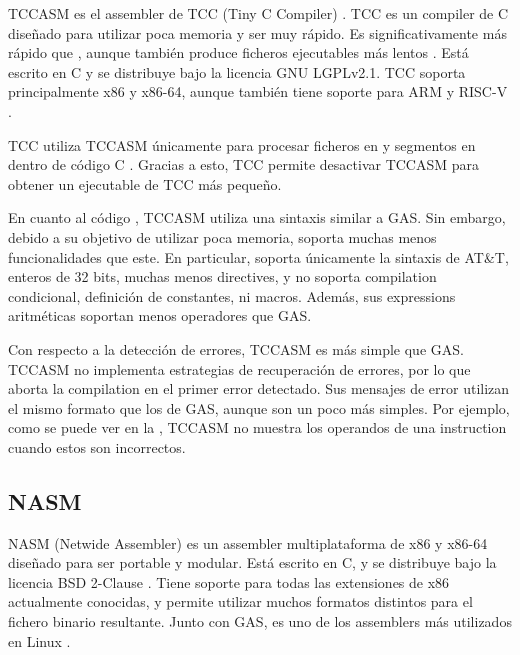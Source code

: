 TCCASM es el \gls{assembler} de TCC (Tiny C Compiler) \parencite{tcc}. TCC es un
\gls{compiler} de C diseñado para utilizar poca memoria y ser muy rápido. Es
significativamente más rápido  que
, aunque también produce ficheros ejecutables más lentos
\parencite{tcc-speed}. Está escrito en C y se distribuye bajo la licencia GNU
LGPLv2.1. TCC soporta principalmente x86 y x86-64, aunque también tiene soporte para
ARM y RISC-V \parencite{tcc-manual} \parencite{tcc-arm} \parencite{tcc-riscv}.

TCC utiliza TCCASM únicamente para procesar ficheros en
 y segmentos en 
dentro de código C \parencite{tcc-manual}. Gracias a esto, TCC permite
desactivar TCCASM para obtener un ejecutable de TCC más pequeño.

En cuanto al código , TCCASM utiliza una sintaxis
similar a \gls{GAS}. Sin embargo, debido a su objetivo de utilizar poca memoria,
soporta muchas menos funcionalidades que este. En particular, soporta únicamente
la sintaxis de AT\&T, enteros de 32 bits, muchas menos \glspl{directive}, y no
soporta \gls{compilation} condicional, definición de constantes, ni
\glspl{macro}. Además, sus \glspl{expression} aritméticas soportan menos
operadores que \gls{GAS}.

Con respecto a la detección de errores, TCCASM es más simple que \gls{GAS}.
TCCASM no implementa estrategias de recuperación de errores, por lo que aborta
la \gls{compilation} en el primer error detectado. Sus mensajes de error
utilizan el mismo formato que los de \gls{GAS}, aunque son un poco más simples.
Por ejemplo, como se puede ver en la , TCCASM no muestra
los operandos de una \gls{instruction} cuando estos son incorrectos.


\subsection{NASM}

NASM (Netwide Assembler) \parencite{NASM} es un \gls{assembler} multiplataforma
de x86 y x86-64 diseñado para ser portable y modular. Está escrito en C, y se
distribuye bajo la licencia BSD 2-Clause \parencite{bsd-2c}. Tiene soporte para
todas las extensiones de x86 actualmente conocidas, y permite utilizar muchos
formatos distintos para el fichero binario resultante. Junto con \gls{GAS}, es
uno de los \glspl{assembler} más utilizados en Linux
\parencite{assembler-usage}.

